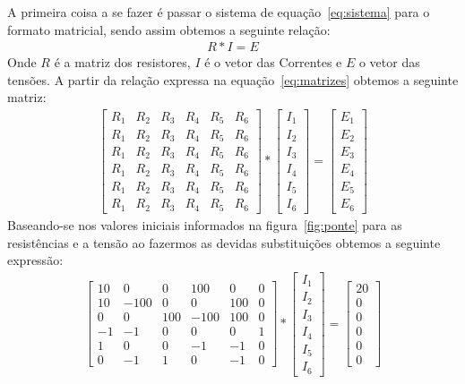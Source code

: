 \documentclass[12pt, hidelinks]{article}
\begin{document}
A primeira coisa a se fazer é passar o sistema de equação~\eqref{eq:sistema} para o formato matricial, sendo assim obtemos a seguinte relação:
\begin{eqnarray}\label{eq:matrizes}
  R * I = E
\end{eqnarray}
Onde $R$ é a matriz dos resistores, $I$ é o vetor das Correntes e $E$ o vetor das tensões.
A partir da relação expressa na equação~\eqref{eq:matrizes} obtemos a seguinte matriz:
\begin{eqnarray}\label{eq:matrizes2}
\left[\begin{array}{rrrrrr}
R_1 & R_2 & R_3 & R_4 & R_5 & R_6\\
R_1 & R_2 & R_3 & R_4 & R_5 & R_6\\
R_1 & R_2 & R_3 & R_4 & R_5 & R_6\\
R_1 & R_2 & R_3 & R_4 & R_5 & R_6\\
R_1 & R_2 & R_3 & R_4 & R_5 & R_6\\
R_1 & R_2 & R_3 & R_4 & R_5 & R_6
\end{array}\right] *
\left[\begin{array}{r}
I_1\\I_2\\I_3\\I_4\\I_5\\I_6
\end{array}\right] =
\left[\begin{array}{r}
E_1\\E_2\\E_3\\E_4\\E_5\\E_6
\end{array}\right]
\end{eqnarray}
Baseando-se nos valores iniciais informados na figura~\eqref{fig:ponte} para as resistências e a tensão ao fazermos as devidas
substituições obtemos a seguinte expressão:
\begin{eqnarray}\label{eq:matrizes3}
\left[\begin{array}{rrrrrr}
10 & 0 & 0 & 100 & 0 & 0\\
10 & -100 & 0 & 0 & 100 & 0\\
0 & 0 & 100 & -100 & 100 & 0\\
-1 & -1 & 0 & 0 & 0 & 1\\
1 & 0 & 0 & -1 & -1 & 0\\
0 & -1 & 1 & 0 & -1 & 0
\end{array}\right] *
\left[\begin{array}{r}
I_1\\I_2\\I_3\\I_4\\I_5\\I_6
\end{array}\right] =
\left[\begin{array}{r}
20\\0\\0\\0\\0\\0
\end{array}\right]
\end{eqnarray}
\end{document}
